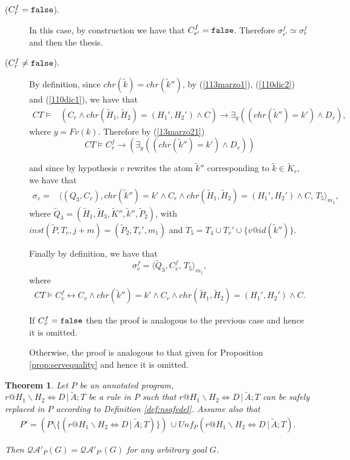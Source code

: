\documentclass[final]{acmtrans2e}
\newtheorem{theorem}{Theorem}[section]
\newcommand{\la}{\langle}
\newcommand{\ra}{\rangle}
\begin{document}
\begin{description}
  \item[($C_{r}^f = \tt false$).] In this case, by construction we have that $C_{r'}^f = \tt false$. Therefore $ \sigma_{r'}^f \simeq  \sigma_{r}^f$ and then the thesis.
  \item[($C_{r}^f    \neq \tt false$).]
  By definition, since
$chr(\tilde k)=chr(\tilde k'')$, by (\ref{113marzo1}), (\ref{110dic2}) and (\ref{110dic1}), we have that
\[\begin{array}{ll}
    CT\models  & (C_r\wedge
     chr(\tilde H_1, \tilde H_2)= (H_1', H_2')\wedge C)
     \rightarrow
     \exists_y((chr(\tilde k'')=k')\wedge D_v),
  \end{array}
 \]
where $ y=Fv(k)$. Therefore
by (\ref{13marzo21})
\[CT\models  C_{r}^f
     \rightarrow  (\exists_y((chr(\tilde k'')=k')\wedge D_v))
 \]

and since by hypothesis $v$ rewrites the atom $\tilde k''$ corresponding to $\tilde k \in \tilde K_r$, we have that
$$\begin{array}{ll}
    \sigma_{v}=&\la (Q_3 ,  C_v),
     chr(\tilde k'')= k'\wedge C_r\wedge
     chr(\tilde H_1, \tilde H_2)= (H_1', H_2')\wedge C, \, T_5\ra_{m_1},
  \end{array}
  $$
     where
     $\tilde Q_3=(\tilde H_1,\tilde H_3,\tilde K'',\tilde k'', \tilde P_2)$, with
     $inst (\tilde P, T_v, j+m) = (\tilde P_2, T_v', m_1)$ and $T_5=T_4 \cup T_v' \cup\{v @id (\tilde
k'')\}$.

    Finally by definition, we have that
$$
    \sigma_{v}^f=\la \tilde Q_3,C_{v}^f, \, T_5\ra_{m_1},
$$
  where
  $$\begin{array}{l}
    CT \models C_{v}^f \leftrightarrow C_v \wedge
     chr(\tilde k'')= k'\wedge C_r\wedge
     chr(\tilde H_1, \tilde H_2)= (H_1', H_2')\wedge C.
  \end{array}
  $$

  If $C_{v}^f =\tt false $ then the proof is analogous to the previous case and hence it is omitted.

  Otherwise, the proof is analogous to that given for Proposition \ref{prop:servequality} and hence it is omitted.
\end{description}
\noindent{$\Box$}


\begin{theorem}\label{lemma:n1completeness}
Let $P$ be an annotated program, \\ $r@H_1\backslash H_2
\Leftrightarrow D\,|\,\tilde A; T$ be a rule in $P$ such that
$r@H_1\backslash H_2 \Leftrightarrow  D\,|\,\tilde A; T $ can be safely replaced
in $P$ according to Definition \ref{def:nsafedel}. Assume also that
\[\begin{array}{l}
  P'  =  (P\setminus   \{(r@H_1\backslash H_2 \Leftrightarrow D\,|\,\tilde A; T)\} ) \, \cup
   Unf_{P}(r@H_1\backslash H_2 \Leftrightarrow D\,|\,\tilde A; T).
\end{array}
\]

Then $\mathcal{QA'}_{P}(G)=\mathcal{QA'}_{P'}(G)$ for any arbitrary
goal $G$.
\end{theorem}
\end{document}
